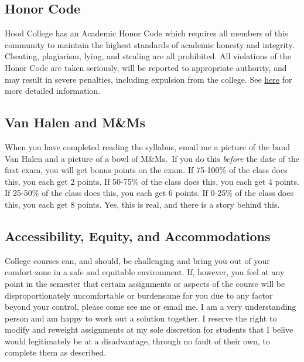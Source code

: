\documentclass{article}
\begin{document}
\hypertarget{honor-code}{%
\subsection*{Honor Code}\label{honor-code}}

Hood College has an Academic Honor Code which requires all members of
this community to maintain the highest standards of academic honesty and
integrity. Cheating, plagiarism, lying, and stealing are all prohibited.
All violations of the Honor Code are taken seriously, will be reported
to appropriate authority, and may result in severe penalties, including
expulsion from the college. See
\href{http://hood.smartcatalogiq.com/en/2016-2017/Catalog/The-Spirit-of-Hood/The-Academic-Honor-Code-and-Code-of-Conduct}{here}
for more detailed information.

\hypertarget{van-halen-and-mms}{%
\subsection*{Van Halen and M\&Ms}\label{van-halen-and-mms}}

When you have completed reading the syllabus, email me a picture of the
band Van Halen and a picture of a bowl of M\&Ms.~If you do this
\emph{before} the date of the first exam, you will get bonus points on
the exam. If 75-100\% of the class does this, you each get 2 points. If
50-75\% of the class does this, you each get 4 points. If 25-50\% of the
class does this, you each get 6 points. If 0-25\% of the class does
this, you each get 8 points. Yes, this is real, and there is a story
behind this.

\hypertarget{accessibility-equity-and-accommodations}{%
\subsection*{Accessibility, Equity, and
Accommodations}\label{accessibility-equity-and-accommodations}}

College courses can, and should, be challenging and bring you out of
your comfort zone in a safe and equitable environment. If, however, you
feel at any point in the semester that certain assignments or aspects of
the course will be disproportionately uncomfortable or burdensome for
you due to any factor beyond your control, please come see me or email
me. I am a very understanding person and am happy to work out a solution
together. I reserve the right to modify and reweight assignments at my
sole discretion for students that I belive would legitimately be at a
disadvantage, through no fault of their own, to complete them as
described.
\end{document}
